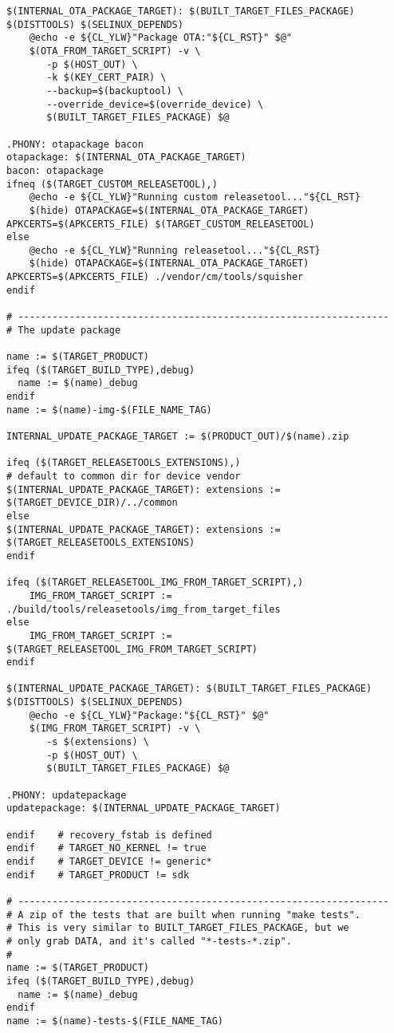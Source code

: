 \documentclass[12pt,a4paper]{article}
\begin{document}
\begin{verbatim}
$(INTERNAL_OTA_PACKAGE_TARGET): $(BUILT_TARGET_FILES_PACKAGE) $(DISTTOOLS) $(SELINUX_DEPENDS)
	@echo -e ${CL_YLW}"Package OTA:"${CL_RST}" $@"
	$(OTA_FROM_TARGET_SCRIPT) -v \
	   -p $(HOST_OUT) \
	   -k $(KEY_CERT_PAIR) \
	   --backup=$(backuptool) \
	   --override_device=$(override_device) \
	   $(BUILT_TARGET_FILES_PACKAGE) $@

.PHONY: otapackage bacon
otapackage: $(INTERNAL_OTA_PACKAGE_TARGET)
bacon: otapackage
ifneq ($(TARGET_CUSTOM_RELEASETOOL),)
	@echo -e ${CL_YLW}"Running custom releasetool..."${CL_RST}
	$(hide) OTAPACKAGE=$(INTERNAL_OTA_PACKAGE_TARGET) APKCERTS=$(APKCERTS_FILE) $(TARGET_CUSTOM_RELEASETOOL)
else
	@echo -e ${CL_YLW}"Running releasetool..."${CL_RST}
	$(hide) OTAPACKAGE=$(INTERNAL_OTA_PACKAGE_TARGET) APKCERTS=$(APKCERTS_FILE) ./vendor/cm/tools/squisher
endif

# -----------------------------------------------------------------
# The update package

name := $(TARGET_PRODUCT)
ifeq ($(TARGET_BUILD_TYPE),debug)
  name := $(name)_debug
endif
name := $(name)-img-$(FILE_NAME_TAG)

INTERNAL_UPDATE_PACKAGE_TARGET := $(PRODUCT_OUT)/$(name).zip

ifeq ($(TARGET_RELEASETOOLS_EXTENSIONS),)
# default to common dir for device vendor
$(INTERNAL_UPDATE_PACKAGE_TARGET): extensions := $(TARGET_DEVICE_DIR)/../common
else
$(INTERNAL_UPDATE_PACKAGE_TARGET): extensions := $(TARGET_RELEASETOOLS_EXTENSIONS)
endif

ifeq ($(TARGET_RELEASETOOL_IMG_FROM_TARGET_SCRIPT),)
    IMG_FROM_TARGET_SCRIPT := ./build/tools/releasetools/img_from_target_files
else
    IMG_FROM_TARGET_SCRIPT := $(TARGET_RELEASETOOL_IMG_FROM_TARGET_SCRIPT)
endif

$(INTERNAL_UPDATE_PACKAGE_TARGET): $(BUILT_TARGET_FILES_PACKAGE) $(DISTTOOLS) $(SELINUX_DEPENDS)
	@echo -e ${CL_YLW}"Package:"${CL_RST}" $@"
	$(IMG_FROM_TARGET_SCRIPT) -v \
	   -s $(extensions) \
	   -p $(HOST_OUT) \
	   $(BUILT_TARGET_FILES_PACKAGE) $@

.PHONY: updatepackage
updatepackage: $(INTERNAL_UPDATE_PACKAGE_TARGET)

endif    # recovery_fstab is defined
endif    # TARGET_NO_KERNEL != true
endif    # TARGET_DEVICE != generic*
endif    # TARGET_PRODUCT != sdk

# -----------------------------------------------------------------
# A zip of the tests that are built when running "make tests".
# This is very similar to BUILT_TARGET_FILES_PACKAGE, but we
# only grab DATA, and it's called "*-tests-*.zip".
#
name := $(TARGET_PRODUCT)
ifeq ($(TARGET_BUILD_TYPE),debug)
  name := $(name)_debug
endif
name := $(name)-tests-$(FILE_NAME_TAG)


\end{verbatim}
\end{document}
